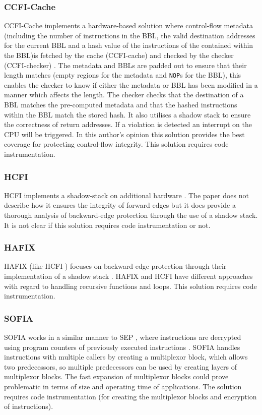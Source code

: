 \subsubsection*{CCFI-Cache}
CCFI-Cache implements a hardware-based solution where control-flow metadata (including the number of instructions in the BBL, the valid destination addresses for the current BBL and a hash value of the instructions of the contained within the BBL)is fetched by the cache (CCFI-cache) and checked by the checker (CCFI-checker) \cite{Danger2018}. The metadata and BBLs are padded out to ensure that their length matches (empty regions for the metadata and \verb|NOP|s for the BBL), this enables the checker to know if either the metadata or BBL has been modified in a manner which affects the length. The checker checks that the destination of a BBL matches the pre-computed metadata and that the hashed instructions within the BBL match the stored hash. It also utilises a shadow stack to ensure the correctness of return addresses. If a violation is detected an interrupt on the CPU will be triggered. In this author's opinion this solution provides the best coverage for protecting control-flow integrity. This solution requires code instrumentation.

\subsubsection*{HCFI}
HCFI implements a shadow-stack on additional hardware \cite{Danger2018}. The paper does not describe how it ensures the integrity of forward edges but it does provide a thorough analysis of backward-edge protection through the use of a shadow stack. It is not clear if this solution requires code instrumentation or not.

\subsubsection*{HAFIX}
HAFIX (like HCFI \cite{Danger2018}) focuses on backward-edge protection through their implementation of a shadow stack \cite{Davi2015}. HAFIX and HCFI have different approaches with regard to handling recursive functions and loops. This solution requires code instrumentation.

\subsubsection*{SOFIA}
SOFIA works in a similar manner to SEP \cite{Lee2019}, where instructions are decrypted using program counters of previously executed instructions \cite{Davi2015}. SOFIA handles instructions with multiple callers by creating a multiplexor block, which allows two predecessors, so multiple predecessors can  be used by creating layers of multiplexor blocks. The fast expansion of multiplexor blocks could prove problematic in terms of size and operating time of applications. The solution requires code instrumentation (for creating the multiplexor blocks and encryption of instructions).

